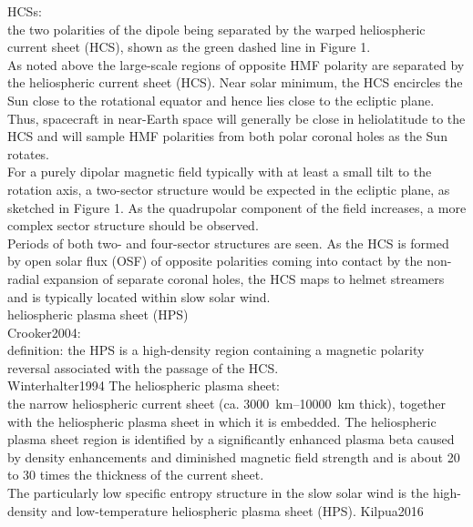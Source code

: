 \citet{Owens2013} HCSs:\\
the two polarities of the dipole being separated by the warped heliospheric current sheet (HCS), shown as the green dashed line in Figure 1.\\
As noted above the large-scale regions of opposite HMF polarity are separated by the heliospheric current sheet (HCS). Near solar minimum, the HCS encircles the Sun close to the rotational equator and hence lies close to the ecliptic plane. Thus, spacecraft in near-Earth space will generally be close in heliolatitude to the HCS and will sample HMF polarities from both polar coronal holes as the Sun rotates.\\
For a purely dipolar magnetic field typically with at least a small tilt to the rotation axis, a two-sector structure would be expected in the ecliptic plane, as sketched in Figure 1. As the quadrupolar component of the field increases, a more complex sector structure should be observed.\\
Periods of both two- and four-sector structures are seen. As the HCS is formed by open solar flux (OSF) of opposite polarities coming into contact by the non-radial expansion of separate coronal holes, the HCS maps to helmet streamers and is typically located within slow solar wind.\\


heliospheric plasma sheet (HPS)\\

Crooker2004:\\
definition: the HPS is a high-density region containing a magnetic polarity reversal associated with the passage of the HCS.\\

Winterhalter1994 The heliospheric plasma sheet:\\
the narrow heliospheric current sheet (ca. \SIrange{3000}{10000}{\km} thick), together with the heliospheric plasma sheet in which it is embedded. The heliospheric plasma sheet region is identified by a significantly enhanced plasma beta caused by density enhancements and diminished magnetic field strength and is about 20 to 30 times the thickness of the current sheet.\\

The particularly low specific entropy structure in the slow solar wind is the high-density and low-temperature heliospheric plasma sheet (HPS). Kilpua2016\\



